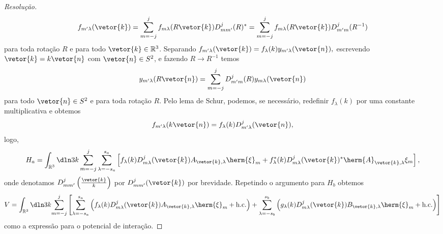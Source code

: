 \begin{proof}[Resolução]
   \begin{equation*}
      f_{m'\lambda}(\vetor{k}) = \sum_{m = -j}^{j} f_{m\lambda}(R\vetor{k}) D^j_{mm'}(R)^* = \sum_{m = -j}^{j} f_{m \lambda}(R\vetor{k}) D^{j}_{m' m}(R^{-1})
   \end{equation*}
   para toda rotação \(R\) e para todo \(\vetor{k} \in \mathbb{R}^3\). Separando  \(f_{m' \lambda}(\vetor{k}) = f_{\lambda}(k) y_{m'\lambda}(\vetor{n}),\) escrevendo \(\vetor{k} = k\vetor{n}\) com \(\vetor{n} \in S^2\), e fazendo \(R \to R^{-1}\) temos
   \begin{equation*}
      y_{m' \lambda}(R\vetor{n}) = \sum_{m = -j}^{j}  D^{j}_{m'm}(R)y_{m \lambda}(\vetor{n})
   \end{equation*}
   para todo \(\vetor{n} \in S^2\) e para toda rotação \(R\). Pelo lema de Schur, podemos, se necessário, redefinir \(f_{\lambda}(k)\) por uma constante multiplicativa e obtemos
   \begin{equation*}
      f_{m' \lambda}(k\vetor{n}) = f_{\lambda}(k) D^{j}_{m' \lambda}(\vetor{n}),
   \end{equation*}
   logo,
   \begin{equation*}
      H_a = \int_{\mathbb{R}^3} \dln3k \sum_{m = -j}^{j} \sum_{\lambda = -s_a}^{s_a} \left[f_\lambda(k) D^{j}_{m \lambda}(\vetor{k}) A_{\vetor{k},\lambda} \herm{\xi}_m + f^*_\lambda(k) D^{j}_{m \lambda}(\vetor{k})^* \herm{A}_{\vetor{k}, \lambda} \xi_m\right],
   \end{equation*}
   onde denotamos \(D^{j}_{mm'}\left(\frac{\vetor{k}}{k}\right)\) por \(D^{j}_{mm'}(\vetor{k})\) por brevidade. Repetindo o argumento para \(H_b\) obtemos
   \begin{equation*}
      V = \int_{\mathbb{R}^3} \dln3k{\sum_{m = -j}^{j}{\left[\sum_{\lambda = -s_a}^{s_a}\left(f_{\lambda}(k) D^{j}_{m \lambda}(\vetor{k}) A_{\vetor{k},\lambda} \herm{\xi}_m +\mathrm{h.c.}\right) + \sum_{\lambda = -s_b}^{s_b}\left(g_{\lambda}(k)D^{j}_{m \lambda}(\vetor{k}) B_{\vetor{k},\lambda} \herm{\xi}_m + \mathrm{h.c.}\right)\right]}}
   \end{equation*}
   como a expressão para o potencial de interação.


\end{proof}
